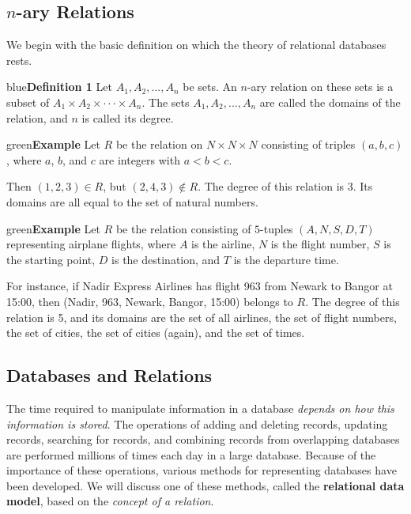 \documentclass[11pt]{article}
\newenvironment{example}[1][\unskip]{\begin{mybox}{green}{\textbf{Example} {#1}}}{\end{mybox}}
\newenvironment{definition}[1]{\begin{mybox}{blue}{\textbf{Definition #1}}}{\end{mybox}}
\begin{document}
\subsection{$n$-ary Relations}

We begin with the basic definition on which the theory of relational databases rests.

\begin{definition}{1}
Let $A_1, A_2, ..., A_n$ be sets. An $n$-ary relation on these sets is a subset of $A_1 \times A_2 \times \cdot \cdot \cdot \times A_n$. The sets $A_1, A_2, ..., A_n$ are called the domains of the relation, and $n$ is called its degree.
\end{definition}

\begin{example}
Let $R$ be the relation on $N \times N \times N$ consisting of triples $(a, b, c)$, where $a$, $b$, and $c$ are integers with $a < b < c$. 

Then $(1, 2, 3) \in R$, but $(2, 4, 3) \notin R$. The degree of this relation is $3$. Its domains are all equal to the set of natural numbers.
\end{example}

\begin{example}
Let $R$ be the relation consisting of $5$-tuples $(A, N, S, D, T)$ representing airplane flights, where $A$ is the airline, $N$ is the flight number, $S$ is the starting point, $D$ is the destination, and $T$ is the departure time. 

For instance, if Nadir Express Airlines has flight 963 from Newark to Bangor at 15:00, then (Nadir, 963, Newark, Bangor, 15:00) belongs to $R$. The degree of this relation is 5, and its domains are the set of all airlines, the set of flight numbers, the set of cities, the set of cities (again), and the set of times.
\end{example}

\subsection{Databases and Relations}

The time required to manipulate information in a database \textit{depends on how this information is stored}. The operations of adding and deleting records, updating records, searching for records, and combining records from overlapping databases are performed millions of times each day in a large database. Because of the importance of these operations, various methods for representing databases have been developed. We will discuss one of these methods, called the \textbf{relational data model}, based on the \textit{concept of a relation}.
\end{document}
